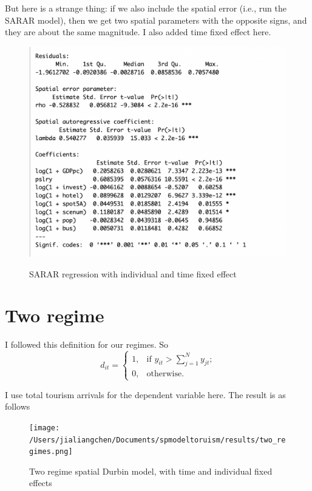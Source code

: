 \documentclass[11pt,a4paper]{amsart}
\theoremstyle{plain}
\theoremstyle{definition}
\begin{document}
But here is a strange thing: if we also include the spatial error (i.e., run the SARAR model), then we get two spatial parameters with the opposite signs, and they are about the same magnitude. I also added time fixed effect here.
\begin{figure}[hbt]
	{\centering \includegraphics[scale=0.68]{sararfe}}
	\caption{SARAR regression with individual and time fixed effect}\label{F:sararfe}
\end{figure}

\newpage

\section{Two regime}

I followed this definition for our regimes.  So
\[	d_{it} = \begin{cases}
	1, &\text{if $y_{it} > \sum_{j = 1}^{N}y_{jt}$;}\\
	0, &\text{otherwise.}
\end{cases}	\]

I use total tourism arrivals for the dependent variable here. The result is as follows 

\begin{figure}[hbt]
	{\centering \texttt{[image: /Users/jialiangchen/Documents/spmodeltoruism/results/two\_regimes.png]}}
	\caption{Two regime spatial Durbin model, with time and individual fixed effects}\label{F:2regimes}
\end{figure}
\end{document}
